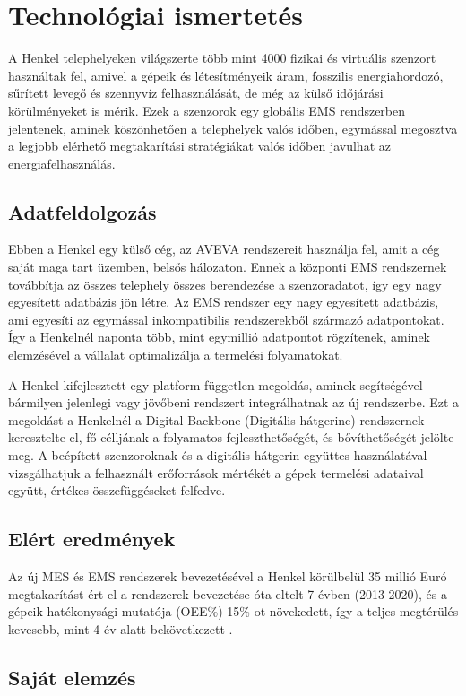\section{Technológiai ismertetés}
A Henkel telephelyeken világszerte több mint 4000 fizikai és virtuális szenzort használtak fel, amivel a gépeik és létesítményeik áram, fosszilis energiahordozó, sűrített levegő és szennyvíz felhasználását, de még az külső időjárási körülményeket is mérik. Ezek a szenzorok egy globális EMS rendszerben jelentenek, aminek köszönhetően a telephelyek valós időben, egymással megosztva a legjobb elérhető megtakarítási stratégiákat valós időben javulhat az energiafelhasználás. 
\subsection{Adatfeldolgozás}
Ebben a Henkel egy külső cég, az AVEVA rendszereit használja fel\cite{AVEVA2021}, amit a cég saját maga tart  üzemben, belsős hálozaton. Ennek a központi EMS rendszernek továbbítja az összes telephely összes berendezése a szenzoradatot, így egy nagy egyesített adatbázis jön létre. Az EMS rendszer egy nagy egyesített adatbázis, ami egyesíti az egymással inkompatibilis rendszerekből származó adatpontokat. Így a Henkelnél naponta több, mint egymillió adatpontot rögzítenek, aminek elemzésével a vállalat optimalizálja a termelési folyamatokat.

A Henkel kifejlesztett egy platform-független megoldás, aminek segítségével bármilyen jelenlegi vagy jövőbeni rendszert integrálhatnak az új rendszerbe. Ezt a megoldást a Henkelnél a Digital Backbone (Digitális hátgerinc) rendszernek keresztelte el, fő célljának a folyamatos fejleszthetőségét, és bővíthetőségét jelölte meg.
A beépített szenzoroknak és a digitális hátgerin együttes használatával vizsgálhatjuk a felhasznált erőforrások mértékét a gépek termelési adataival együtt, értékes összefüggéseket felfedve.
\subsection{Elért eredmények}
Az új MES és EMS rendszerek bevezetésével a Henkel körülbelül 35 millió Euró megtakarítást ért el a rendszerek bevezetése óta eltelt 7 évben (2013-2020), és a gépeik hatékonysági mutatója (OEE\%) 15\%-ot növekedett, így a teljes megtérülés kevesebb, mint 4 év alatt bekövetkezett \cite{AVEVA2021}.

\subsection*{Saját elemzés}


